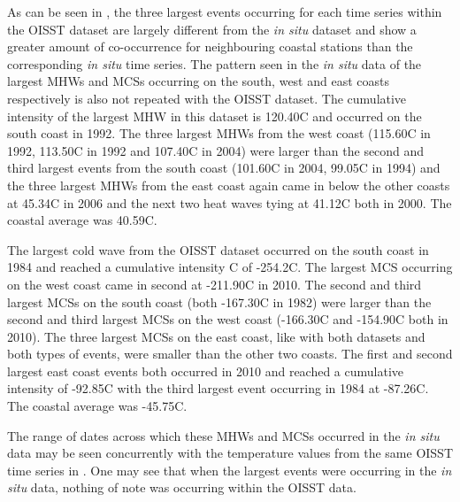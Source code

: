 \documentclass[a4paper,10pt,review]{elsarticle}
\begin{document}
As can be seen in , the three largest events occurring for each time series within the OISST dataset are largely different from the \emph{in situ} dataset and show a greater amount of co-occurrence for neighbouring coastal stations than the corresponding \emph{in situ} time series. The pattern seen in the \emph{in situ} data of the largest MHWs and MCSs occurring on the south, west and east coasts respectively is also not repeated with the OISST dataset. The cumulative intensity of the largest MHW in this dataset is 120.40\degree C and occurred on the south coast in 1992. The three largest MHWs from the west coast (115.60\degree C in 1992, 113.50\degree C in 1992 and 107.40\degree C in 2004) were larger than the second and third largest events from the south coast (101.60\degree C in 2004, 99.05\degree C in 1994) and the three largest MHWs from the east coast again came in below the other coasts at 45.34\degree C in 2006 and the next two heat waves tying at 41.12\degree C both in 2000. The coastal average was 40.59\degree C.

The largest cold wave from the OISST dataset occurred on the south coast in 1984 and reached a cumulative intensity \degree C of -254.2\degree C. The largest MCS occurring on the west coast came in second at -211.90\degree C in 2010. The second and third largest MCSs on the south coast (both -167.30\degree C in 1982) were larger than the second and third largest MCSs on the west coast (-166.30\degree C and -154.90\degree C both in 2010). The three largest MCSs on the east coast, like with both datasets and both types of events, were smaller than the other two coasts. The first and second largest east coast events both occurred in 2010 and reached a cumulative intensity of -92.85\degree C with the third largest event occurring in 1984 at -87.26\degree C. The coastal average was -45.75\degree C.

The range of dates across which these MHWs and MCSs occurred in the \emph{in situ} data may be seen concurrently with the temperature values from the same OISST time series in . One may see that when the largest events were occurring in the \emph{in situ} data, nothing of note was occurring within the OISST data.
\end{document}
